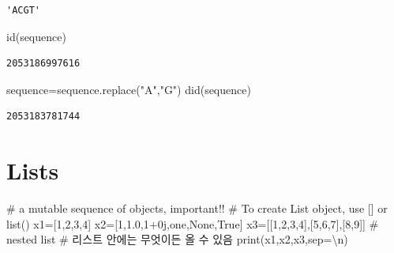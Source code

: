 \documentclass[
  letterpaper,
  DIV=11,
  numbers=noendperiod]{scrreprt}
\newenvironment{Shaded}{\begin{snugshade}}{\end{snugshade}}
\newcommand{\BuiltInTok}[1]{\textcolor[rgb]{0.00,0.23,0.31}{#1}}
\newcommand{\CharTok}[1]{\textcolor[rgb]{0.13,0.47,0.30}{#1}}
\newcommand{\CommentTok}[1]{\textcolor[rgb]{0.37,0.37,0.37}{#1}}
\newcommand{\DecValTok}[1]{\textcolor[rgb]{0.68,0.00,0.00}{#1}}
\newcommand{\FloatTok}[1]{\textcolor[rgb]{0.68,0.00,0.00}{#1}}
\newcommand{\NormalTok}[1]{\textcolor[rgb]{0.00,0.23,0.31}{#1}}
\newcommand{\OperatorTok}[1]{\textcolor[rgb]{0.37,0.37,0.37}{#1}}
\newcommand{\OtherTok}[1]{\textcolor[rgb]{0.00,0.23,0.31}{#1}}
\newcommand{\StringTok}[1]{\textcolor[rgb]{0.13,0.47,0.30}{#1}}
\newcommand{\VariableTok}[1]{\textcolor[rgb]{0.07,0.07,0.07}{#1}}
\begin{document}
\begin{verbatim}
'ACGT'
\end{verbatim}

\begin{Shaded}
\begin{Highlighting}[]
\BuiltInTok{id}\NormalTok{(sequence)}
\end{Highlighting}
\end{Shaded}

\begin{verbatim}
2053186997616
\end{verbatim}

\begin{Shaded}
\begin{Highlighting}[]
\NormalTok{sequence}\OperatorTok{=}\NormalTok{sequence.replace(}\StringTok{"A"}\NormalTok{,}\StringTok{"G"}\NormalTok{)}
\NormalTok{did(sequence)}
\end{Highlighting}
\end{Shaded}

\begin{verbatim}
2053183781744
\end{verbatim}

\section{Lists}\label{lists}

\begin{Shaded}
\begin{Highlighting}[]
\CommentTok{\# a mutable sequence of objects, important!!}
\CommentTok{\# To create List object, use [] or list()}
\NormalTok{x1}\OperatorTok{=}\NormalTok{[}\DecValTok{1}\NormalTok{,}\DecValTok{2}\NormalTok{,}\DecValTok{3}\NormalTok{,}\DecValTok{4}\NormalTok{]}
\NormalTok{x2}\OperatorTok{=}\NormalTok{[}\DecValTok{1}\NormalTok{,}\FloatTok{1.0}\NormalTok{,}\DecValTok{1}\OperatorTok{+}\OtherTok{0j}\NormalTok{,}\StringTok{\textquotesingle{}one\textquotesingle{}}\NormalTok{,}\VariableTok{None}\NormalTok{,}\VariableTok{True}\NormalTok{]}
\NormalTok{x3}\OperatorTok{=}\NormalTok{[[}\DecValTok{1}\NormalTok{,}\DecValTok{2}\NormalTok{,}\DecValTok{3}\NormalTok{,}\DecValTok{4}\NormalTok{],[}\DecValTok{5}\NormalTok{,}\DecValTok{6}\NormalTok{,}\DecValTok{7}\NormalTok{],[}\DecValTok{8}\NormalTok{,}\DecValTok{9}\NormalTok{]] }\CommentTok{\# nested list}
\CommentTok{\# 리스트 안에는 무엇이든 올 수 있음}
\BuiltInTok{print}\NormalTok{(x1,x2,x3,sep}\OperatorTok{=}\StringTok{\textquotesingle{}}\CharTok{\textbackslash{}n}\StringTok{\textquotesingle{}}\NormalTok{)}
\end{Highlighting}
\end{Shaded}
\end{document}
